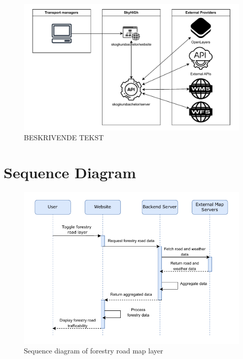 \begin{figure}[h]
    \centering
    \includegraphics[width=1\linewidth]{figures/systemdesign.pdf}
    \caption{BESKRIVENDE TEKST}
    \label{fig:systemarchitecture}
\end{figure}


\section{Sequence Diagram}

\begin{figure}[h]
    \centering
    \includegraphics[width=1\linewidth]{figures/sequence_diagram.pdf}
    \caption{Sequence diagram of forestry road map layer}
    \label{fig:sequence_diagram}
\end{figure}

